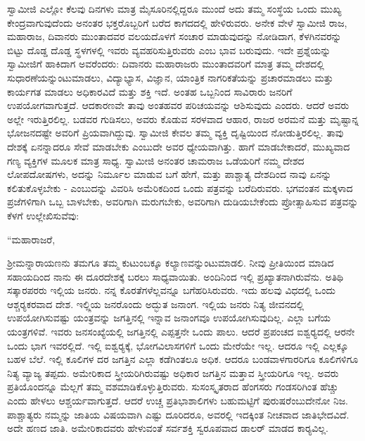  ಸ್ವಾಮೀಜಿ ಎಲ್ಲೋ ಕೆಲವು ದಿನಗಳು ಮಾತ್ರ ಮೈಸೂರಿನಲ್ಲಿದ್ದರೂ ಮುಂದೆ ಅದು ತಮ್ಮ ಸಂಸ್ಥೆಯ ಒಂದು ಮುಖ್ಯ ಕೇಂದ್ರವಾಗುವುದೆಂದು ಅನಂತರ ಭಕ್ತರೊಬ್ಬರಿಗೆ ಬರೆದ ಕಾಗದದಲ್ಲಿ ಹೇಳಿರುವರು. ಅನೇಕ ವೇಳೆ ಸ್ವಾಮೀಜಿ ರಾಜ, ಮಹಾರಾಜ, ದಿವಾನರು ಮುಂತಾದವರ ವಲಯದೊಳಗೆ ಸಂಚಾರ ಮಾಡುವುದನ್ನು ನೋಡಿದಾಗ, ಕೆಳಗಿನವರನ್ನು ಬಿಟ್ಟು ದೊಡ್ಡ ದೊಡ್ಡ ಸ್ಥಳಗಳಲ್ಲಿ ಇವರು ವ್ಯವಹರಿಸುತ್ತಿರುವರು ಎಂಬ ಭಾವ ಬರುವುದು. ಇದೇ ಪ್ರಶ್ನೆಯನ್ನು ಸ್ವಾಮೀಜಿಗೆ ಹಾಕಿದಾಗ ಅವರೆಂದರು: ದಿವಾನರು ಮಹಾರಾಜರು ಮುಂತಾದವರಿಗೆ ಮಾತ್ರ ತಮ್ಮ ದೇಶದಲ್ಲಿ ಸುಧಾರಣೆಯನ್ನುಂಟುಮಾಡಲು, ವಿದ್ಯಾಭ್ಯಾಸ, ವಿಜ್ಞಾನ, ಯಾಂತ್ರಿಕ ನಾಗರಿಕತೆಯನ್ನು ಪ್ರಚಾರಮಾಡಲು ಮತ್ತು ಕಾರ್ಯಗತ ಮಾಡಲು ಅಧಿಕಾರವಿದೆ ಮತ್ತು ಶಕ್ತಿ ಇದೆ. ಅಂತಹ ಒಬ್ಬನಿಂದ ಸಾವಿರಾರು ಜನರಿಗೆ ಉಪಯೋಗವಾಗುತ್ತದೆ. ಆದಕಾರಣವೇ ತಾವು ಅಂತಹವರ ಪರಿಚಯವನ್ನು ಆಶಿಸುವುದು ಎಂದರು. ಆದರೆ ಅವರು ಅಲ್ಲೇ ಇರುತ್ತಿರಲಿಲ್ಲ. ಬಡವರ ಗುಡಿಸಲು, ಅವರು ಕೊಡುವ ಸರಳವಾದ ಆಹಾರ, ರಾಜರ ಅರಮನೆ ಮತ್ತು ಮೃಷ್ಟಾನ್ನ ಭೋಜನದಷ್ಟೇ ಅವರಿಗೆ ಪ್ರಿಯವಾಗಿದ್ದುವು. ಸ್ವಾಮೀಜಿ ಕೇವಲ ತಮ್ಮ ವ್ಯಕ್ತಿ ದೃಷ್ಟಿಯಿಂದ ನೋಡುತ್ತಿರಲಿಲ್ಲ. ತಾವು ದೇಶಕ್ಕೆ ಏನನ್ನಾದರೂ ಸೇವೆ ಮಾಡಬೇಕು ಎಂಬುದೇ ಅವರ ಧ್ಯೇಯವಾಗಿತ್ತು. ಹಾಗೆ ಮಾಡಬೇಕಾದರೆ, ಮುಖ್ಯವಾದ ಗಣ್ಯ ವ್ಯಕ್ತಿಗಳ ಮೂಲಕ ಮಾತ್ರ ಸಾಧ್ಯ. ಸ್ವಾಮೀಜಿ ಅನಂತರ ಚಾಮರಾಜ ಒಡೆಯರಿಗೆ ನಮ್ಮ ದೇಶದ ಲೋಪದೋಷಗಳು, ಅದನ್ನು ನಿರ್ಮೂಲ ಮಾಡುವ ಬಗೆ ಹೇಗೆ, ಮತ್ತು ಪಾಶ್ಚಾತ್ಯ ದೇಶದಿಂದ ನಾವು ಏನನ್ನು ಕಲಿತುಕೊಳ್ಳಬೇಕು - ಎಂಬುದನ್ನು ವಿವರಿಸಿ ಅಮೆರಿಕದಿಂದ ಒಂದು ಪತ್ರವನ್ನು ಬರೆದಿರುವರು. ಭಗವಂತನ ಮಕ್ಕಳಾದ ಪ್ರಜೆಗಳಿಗಾಗಿ ಒಬ್ಬ ಬಾಳಬೇಕು, ಅವರಿಗಾಗಿ ಮರುಗಬೇಕು, ಅವರಿಗಾಗಿ ದುಡಿಯಬೇಕೆಂದು ಪ್ರೋತ್ಸಾಹಿಸುವ ಪತ್ರವನ್ನು ಕೆಳಗೆ ಉಲ್ಲೇಖಿಸುವೆವು: 

 “ಮಹಾರಾಜರೆ, 

 ಶ‍್ರೀಮನ್ನಾರಾಯಣನು ತಮಗೂ ತಮ್ಮ ಕುಟುಂಬಕ್ಕೂ ಕಲ್ಯಾಣವನ್ನುಂಟುಮಾಡಲಿ. ನೀವು ಪ್ರೀತಿಯಿಂದ ಮಾಡಿದ ಸಹಾಯದಿಂದ ನಾನು ಈ ದೂರದೇಶಕ್ಕೆ ಬರಲು ಸಾಧ್ಯವಾಯಿತು. ಅಂದಿನಿಂದ ಇಲ್ಲಿ ಪ್ರಖ್ಯಾತನಾಗಿರುವೆನು. ಅತಿಥಿ ಸತ್ಕಾರಪರರು ಇಲ್ಲಿಯ ಜನರು. ನನ್ನ ಕೊರತೆಗಳೆಲ್ಲವನ್ನೂ ಬಗೆಹರಿಸಿರುವರು. ಇದು ಹಲವು ವಿಧದಲ್ಲಿ ಒಂದು ಆಶ್ಚರ‍್ಯಕರವಾದ ದೇಶ. ಇಲ್ಲ್ಲಿಯ ಜನರೊಂದು ಅದ್ಭುತ ಜನಾಂಗ. ಇಲ್ಲಿಯ ಜನರು ನಿತ್ಯ ಜೀವನದಲ್ಲಿ ಉಪಯೋಗಿಸುವಷ್ಟು ಯಂತ್ರವನ್ನು ಜಗತ್ತಿನಲ್ಲಿ ಇನ್ನಾವ ಜನಾಂಗವೂ ಉಪಯೋಗಿಸುವುದಿಲ್ಲ. ಎಲ್ಲಾ ಬಗೆಯ ಯಂತ್ರಗಳಿವೆ. ಇವರು ಜನಸಂಖ್ಯೆಯಲ್ಲಿ ಜಗತ್ತಿನಲ್ಲಿ ಎಪ್ಪತ್ತನೇ ಒಂದು ಪಾಲು. ಆದರೆ ಪ್ರಪಂಚದ ಐಶ್ವರ‍್ಯದಲ್ಲಿ ಆರನೇ ಒಂದು ಭಾಗ ಇವರಲ್ಲಿದೆ. ಇಲ್ಲಿ ಐಶ್ವರ‍್ಯಕ್ಕೆ, ಭೋಗವಿಲಾಸಗಳಿಗೆ ಒಂದು ಮೇರೆಯೇ ಇಲ್ಲ. ಆದರೂ ಇಲ್ಲಿ ಎಲ್ಲಕ್ಕೂ ಬಹಳ ಬೆಲೆ. ಇಲ್ಲಿ ಕೂಲಿಗಳ ದರ ಜಗತ್ತಿನ ಎಲ್ಲಾ ಕಡೆಗಿಂತಲೂ ಅಧಿಕ. ಆದರೂ ಬಂಡವಾಳಗಾರರಿಗೂ ಕೂಲಿಗಳಿಗೂ ನಿತ್ಯ ವ್ಯಾಜ್ಯ ತಪ್ಪದು. ಅಮೇರಿಕಾದ ಸ್ತ್ರೀಯರಿಗಿರುವಷ್ಟು ಅಧಿಕಾರ ಜಗತ್ತಿನ ಮತ್ತಾವ ಸ್ತ್ರೀಯರಿಗೂ ಇಲ್ಲ. ಅವರು ಪ್ರತಿಯೊಂದನ್ನೂ ಮೆಲ್ಲಗೆ ತಮ್ಮ ವಶಮಾಡಿಕೊಳ್ಳುತ್ತಿರುವರು. ಸುಸಂಸ್ಕೃತರಾದ ಹೆಂಗಸರು ಗಂಡಸರಿಗಿಂತ ಹೆಚ್ಚು ಎಂದು ಹೇಳಲು ಆಶ್ಚರ್ಯವಾಗುತ್ತದೆ. ಆದರೆ ಉಚ್ಚ ಪ್ರತಿಭಾಶಾಲಿಗಳು ಬಹುಮಟ್ಟಿಗೆ ಪುರುಷರೆಂಬುದೇನೋ ನಿಜ. ಪಾಶ್ಚಾತ್ಯರು ನಮ್ಮನ್ನು ಜಾತಿಯ ವಿಷಯವಾಗಿ ಎಷ್ಟು ದೂರಿದರೂ, ಅವರಲ್ಲಿ ಇದಕ್ಕಿಂತ ನೀಚವಾದ ಜಾತಿಭೇದವಿದೆ. ಅದೇ ಹಣದ ಜಾತಿ. ಅಮೇರಿಕಾದವರು ಹೇಳುವಂತೆ ಸರ್ವಶಕ್ತಿ ಸ್ವರೂಪವಾದ ಡಾಲರ್ ಮಾಡದ ಕಾರ‍್ಯವಿಲ್ಲ.


